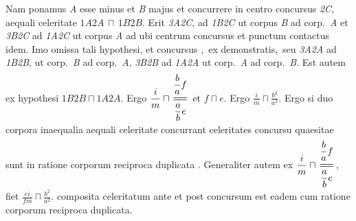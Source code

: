 \vspace{1.5em}
\pstart
Nam ponamus \textit{A} esse minus et \textit{B} majus et concurrere in centro concursus%
\protect{} \textit{{\scriptsize2}C}, aequali celeritate%
\protect{} ${\scriptstyle \textit{1}}A{\scriptstyle \textit{2}}A\, \sqcap\, {\scriptstyle \textit{1}}B{\scriptstyle \textit{2}}B$.  
%
Erit
%
\textit{{\scriptsize3}A{\scriptsize2}C}, ad \textit{{\scriptsize1}B{\scriptsize2}C} ut corpus \textit{B} ad corp.\ \textit{A} et \textit{{\scriptsize3}B{\scriptsize2}C} ad \textit{{\scriptsize1}A{\scriptsize2}C} ut corpus \textit{A} ad 
%
%
ubi centrum concursus\protect{} et %
punctum contactus\protect{} idem. Imo omissa tali hypothesi, et 
%
%
concursus%
\protect{}\lbrack,\rbrack\ ex demonstratis\lbrack,\rbrack\ seu 
%
\textit{{\scriptsize3}A{\scriptsize2}A} ad \textit{{\scriptsize1}B{\scriptsize2}B}, ut corp.\ \textit{B} ad corp.\ \textit{A}, \textit{{\scriptsize3}B{\scriptsize2}B} ad \textit{{\scriptsize1}A{\scriptsize2}A} ut corp.\ \textit{A} ad corp.\ \textit{B}.  
%
Est autem ex hypothesi ${\scriptstyle \textit{1}}B{\scriptstyle \textit{2}}B \sqcap {\scriptstyle \textit{1}}A{\scriptstyle \textit{2}}A$. 
%
Ergo %
$\displaystyle\frac{i}{m} \sqcap \doublefrac{\displaystyle\frac{b}{a}f}{\displaystyle\frac{a}{b}e}$ %
 et $f\sqcap e$. Ergo $\displaystyle\frac{i}{m} \sqcap \displaystyle\frac{b^2}{a^2}$.
Ergo si duo %
corpora inaequalia\protect{} aequali celeritate%
\protect{} concurrant celeritates concursu quaesitae%
\protect{} sunt in ratione corporum reciproca duplicata%
\protect{}. Generaliter autem ex
%
$\displaystyle\frac{i}{m} \sqcap \doublefrac{\displaystyle\frac{b}{a}f}{\displaystyle\frac{a}{b}e}$, 
%
fiet 
%
$\displaystyle\frac{ei}{fm} \sqcap \displaystyle\frac{b^2}{a^2}$.
%
%
composita\protect{} celeritatum ante et post concursum\protect{} est eadem cum ratione corporum reciproca duplicata\protect{}.
